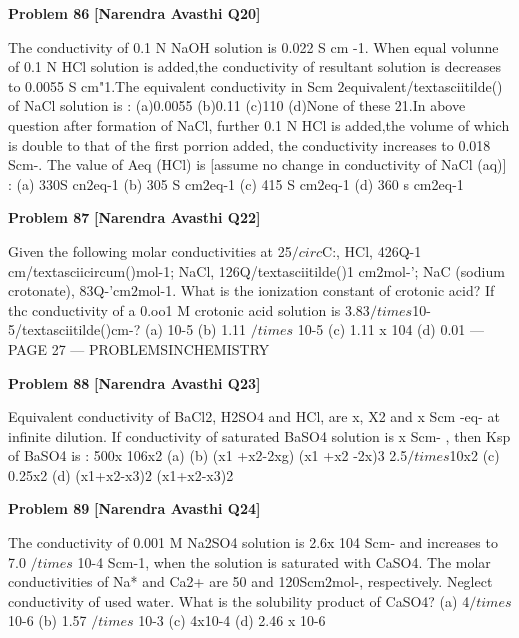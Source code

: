 \begin{problembox}
\textbf{Problem 86} \hfill \textbf{[Narendra Avasthi Q20]}
\label{q:ext-narendra_avasthi_all_questions-86}

The conductivity of 0.1 N NaOH solution is 0.022 S cm -1. When equal volunne of 0.1 N HCl solution
is added,the conductivity of resultant solution is decreases to 0.0055 S cm"1.The equivalent
conductivity in Scm $2$equivalent/textasciitilde() of NaCl solution is : 
(a)0.0055
(b)0.11
(c)110
(d)None of these
21.In above question after formation of NaCl, further 0.1 N HCl is added,the volume of which is
double to that of the first porrion added, the conductivity increases to 0.018 Scm-. The value
of Aeq (HCl) is [assume no change in conductivity of NaCl (aq)] :
(a) 330S cn$2$eq-1
(b) 305 S cm$2$eq-1
(c) 415 S cm$2$eq-1
(d) 360 s cm2eq-1
\end{problembox}

\begin{problembox}
\textbf{Problem 87} \hfill \textbf{[Narendra Avasthi Q22]}
\label{q:ext-narendra_avasthi_all_questions-87}

Given the following molar conductivities at 25$/circ$C:, HCl, 426Q-1 cm/textasciicircum()mol-1; NaCl,
126Q/textasciitilde()1 cm$2$mol-'; NaC (sodium crotonate), 83Q-'cm$2$mol-1. What is the ionization
constant of crotonic acid? If thc conductivity of a 0.oo1 M crotonic acid solution is
3.83$/times$10-5/textasciitilde()cm-?
(a) 10-5
(b) 1.11 $/times$ 10-5
(c) 1.11 x 104
(d) 0.01
--- PAGE 27 ---
PROBLEMSINCHEMISTRY
\end{problembox}

\begin{problembox}
\textbf{Problem 88} \hfill \textbf{[Narendra Avasthi Q23]}
\label{q:ext-narendra_avasthi_all_questions-88}

Equivalent conductivity of BaCl2, H2SO4 and HCl, are x, X2 and x Scm -eq- at infinite
dilution. If conductivity of saturated BaSO4 solution is x Scm- , then Ksp of BaSO4 is :
500x
106x2
(a)
(b)
(x1 +x2-2xg)
(x1 +x2 -2x)3
2.5$/times$10x2
(c)
0.25x2
(d)
(x1+x2-x3)$2$
(x1+x2-x3)2
\end{problembox}

\begin{problembox}
\textbf{Problem 89} \hfill \textbf{[Narendra Avasthi Q24]}
\label{q:ext-narendra_avasthi_all_questions-89}

The conductivity of 0.001 M Na2SO4 solution is 2.6x 104 Scm- and increases to
7.0 $/times$ 10-4 Scm-1, when the solution is saturated with CaSO4. The molar conductivities of Na*
and Ca2+ are 50 and 120Scm$2$mol-, respectively. Neglect conductivity of used water.
What is the solubility product of CaSO4?
(a) 4$/times$ 10-6
(b) 1.57 $/times$ 10-3
(c) 4x10-4
(d) 2.46 x 10-6
\end{problembox}

